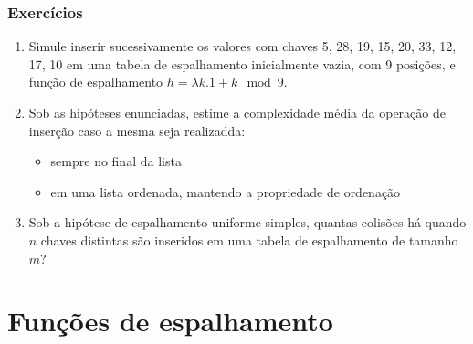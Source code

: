 \documentclass{beamer}
\begin{document}
\begin{frame}
  \frametitle{Exercícios}

  \begin{enumerate}

    \item Simule inserir sucessivamente os valores com chaves 5, 28, 19, 15, 20,
      33, 12, 17, 10 em uma tabela de espalhamento inicialmente vazia, com 9
      posições, e função de espalhamento $h = \lambda k . 1 + k \mod 9$.

    \item Sob as hipóteses enunciadas, estime a complexidade média da operação de inserção caso a mesma
      seja realizadda:
      \begin{itemize}

        \item sempre no final da lista

        \item em uma lista ordenada, mantendo a propriedade de ordenação

      \end{itemize}

    \item Sob a hipótese de espalhamento uniforme simples, quantas colisões há
      quando $n$ chaves distintas são inseridos em uma tabela de espalhamento de
      tamanho $m$?

  \end{enumerate}

\end{frame}

\section{Funções de espalhamento}
\end{document}
